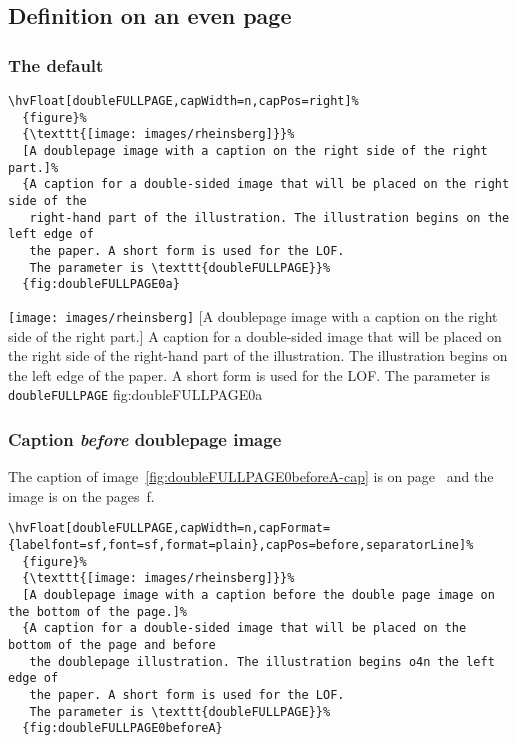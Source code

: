 \documentclass[twoside]{scrartcl}
\makeatletter
\let\hvBlindtext\Blindtext
\def\Blindtext{\par\color{black!40}\hvBlindtext\par\normalcolor}
\def\hvblindtext{\textcolor{black!40}{\blindtext@text}}
\makeatother
\begin{document}
\Blindtext

\hvblindtext

\hvblindtext

\hvblindtext

\Blindtext

\subsection{Definition on an even page}
\hvblindtext
\subsubsection{The default}


\begin{lstlisting}
\hvFloat[doubleFULLPAGE,capWidth=n,capPos=right]%
  {figure}%
  {\texttt{[image: images/rheinsberg]}}%
  [A doublepage image with a caption on the right side of the right part.]%
  {A caption for a double-sided image that will be placed on the right side of the
   right-hand part of the illustration. The illustration begins on the left edge of 
   the paper. A short form is used for the LOF. 
   The parameter is \texttt{doubleFULLPAGE}}%
  {fig:doubleFULLPAGE0a}
\end{lstlisting}


%
  {\texttt{[image: images/rheinsberg]}}%
  [A doublepage image with a caption on the right side of the right part.]%
  {A caption for a double-sided image that will be placed on the right side of the
   right-hand part of the illustration. The illustration begins on the left edge of 
   the paper. A short form is used for the LOF. 
   The parameter is \texttt{doubleFULLPAGE}}%
  {fig:doubleFULLPAGE0a}

\Blindtext

\Blindtext


\subsubsection{Caption \emph{before} doublepage image}
The caption of image~\ref{fig:doubleFULLPAGE0beforeA-cap} is on page~\pageref{fig:doubleFULLPAGE0beforeA-cap} and the image
is on the pages~\pageref{fig:doubleFULLPAGE0beforeA}f.

\begin{lstlisting}
\hvFloat[doubleFULLPAGE,capWidth=n,capFormat={labelfont=sf,font=sf,format=plain},capPos=before,separatorLine]%
  {figure}%
  {\texttt{[image: images/rheinsberg]}}%
  [A doublepage image with a caption before the double page image on the bottom of the page.]%
  {A caption for a double-sided image that will be placed on the bottom of the page and before
   the doublepage illustration. The illustration begins o4n the left edge of 
   the paper. A short form is used for the LOF. 
   The parameter is \texttt{doubleFULLPAGE}}%
  {fig:doubleFULLPAGE0beforeA}
\end{lstlisting}
\end{document}
